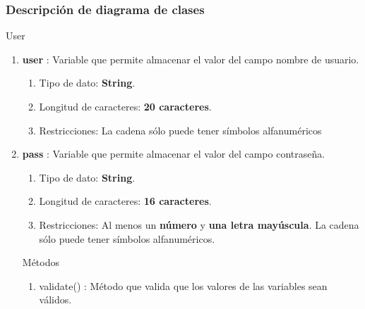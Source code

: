 \documentclass[12pt, a4paper, titlepage]{report}
\begin{document}
			    \subsubsection{Descripción de diagrama de clases}
			    User
			    \begin{enumerate}
    		        \item \textbf{user} : Variable que permite almacenar el valor del campo nombre de usuario.
    		        \begin{enumerate}
    		            \item Tipo de dato: \textbf{String}. \item Longitud de caracteres: \textbf{20 caracteres}.
    		            \item Restricciones: La cadena sólo puede tener símbolos alfanuméricos 
    		        \end{enumerate}
    		        \item \textbf{pass} : Variable que permite almacenar el valor del campo contraseña.
    		        \begin{enumerate}
    		            \item Tipo de dato: \textbf{String}. \item Longitud de caracteres: \textbf{16 caracteres}.
    		            \item Restricciones: Al menos un \textbf{número} y \textbf{una letra mayúscula}. La cadena sólo puede tener símbolos alfanuméricos.
    		        \end{enumerate}
    		        
    		        Métodos
    		        
    		        \begin{enumerate}
    		            \item validate() : Método que valida que los valores de las variables sean válidos.
    		        \end{enumerate}
			    \end{enumerate}
			        
\end{document}
